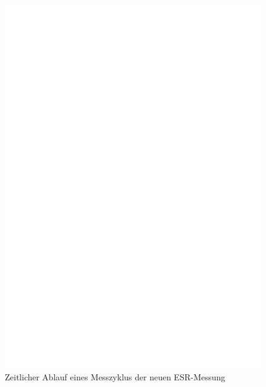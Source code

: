 \begin{figure}[H]
  \centering
    \includegraphics[width=18cm]{../FIG/Cap_esr2_timing.eps}
  \caption{Zeitlicher Ablauf eines Messzyklus der neuen ESR-Messung}
  \label{fig:Cap_esr2_timing}
\end{figure}

